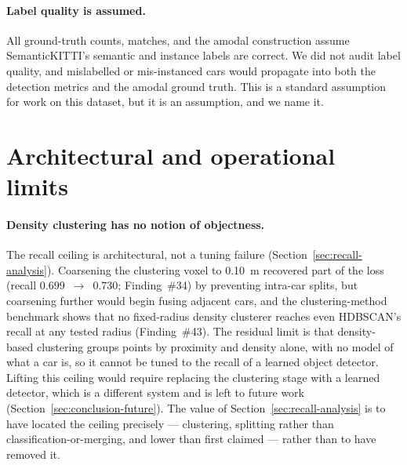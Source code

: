 \paragraph{Label quality is assumed.}
All ground-truth counts, matches, and the amodal construction assume SemanticKITTI's
semantic and instance labels are correct. We did not audit label quality, and mislabelled
or mis-instanced cars would propagate into both the detection metrics and the amodal
ground truth. This is a standard assumption for work on this dataset, but it is an
assumption, and we name it.

\section{Architectural and operational limits}
\label{sec:disc-architectural}

\paragraph{Density clustering has no notion of objectness.}
The recall ceiling is architectural, not a tuning failure (Section~\ref{sec:recall-analysis}). Coarsening the
clustering voxel to \SI{0.10}{\metre} recovered part of the loss
(recall \num{0.699}~$\rightarrow$~\num{0.730}; Finding~\#34) by preventing intra-car
splits, but coarsening further would begin fusing adjacent cars, and the
clustering-method benchmark shows that no fixed-radius density clusterer reaches even
HDBSCAN's recall at any tested radius (Finding~\#43). The residual limit is that
density-based clustering groups points by proximity and density alone, with no model of
what a car is, so it cannot be tuned to the recall of a learned object detector. Lifting
this ceiling would require replacing the clustering stage with a learned detector, which
is a different system and is left to future work (Section~\ref{sec:conclusion-future}). The value of Section~\ref{sec:recall-analysis} is to
have located the ceiling precisely --- clustering, splitting rather than
classification-or-merging, and lower than first claimed --- rather than to have removed it.

